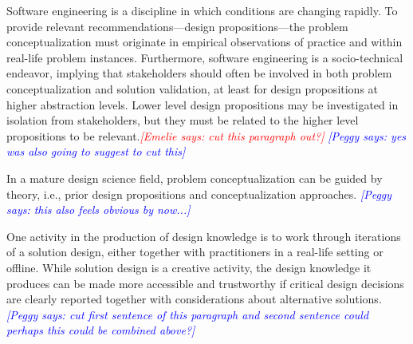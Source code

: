 \documentclass[graybox]{svmult}
\newcommand{\emelie}[1]{\textcolor{red}{{\it [Emelie says: #1]}}}
\newcommand{\peggy}[1]{\textcolor{blue}{{\it [Peggy says: #1]}}}
\newcommand{\emelie}[1]{}
\newcommand{\peggy}[1]{}
\begin{document}
Software engineering is a discipline in which conditions are changing rapidly. To provide relevant recommendations---design propositions---the problem conceptualization must originate in empirical observations of practice and within real-life problem instances. Furthermore, software engineering is a socio-technical endeavor, implying that stakeholders should often be involved in both problem conceptualization and solution validation, at least for design propositions at higher abstraction levels. Lower level design propositions may be investigated in isolation from stakeholders, but they must be related to the higher level propositions to be relevant.\emelie{cut this paragraph out?} 
\peggy{yes was also going to suggest to cut this}

In a mature design science field, problem conceptualization can be guided by theory, i.e., prior design propositions and conceptualization approaches. 
\peggy{this also feels obvious by now...}


One activity in the production of design knowledge is to work through iterations of a solution design, either together with practitioners in a real-life setting or offline. 
While solution design is a creative activity, the design knowledge it produces can be made more accessible and trustworthy if critical design decisions are clearly reported together with considerations about alternative solutions.
\peggy{cut first sentence of this paragraph and second sentence could perhaps this  could be combined above?} 

\end{document}
